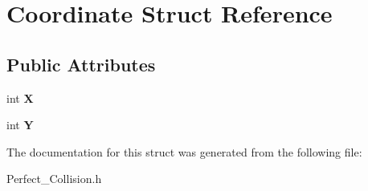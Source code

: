 \hypertarget{structCoordinate}{}\section{Coordinate Struct Reference}
\label{structCoordinate}
\subsection*{Public Attributes}
\begin{DoxyCompactItemize}
\item 
\mbox{\label{structCoordinate_aec4cc10f8f54cb0270096af93fd9e1d6}} 
int {\bfseries X}
\item 
\mbox{\label{structCoordinate_ae378244497aa6e51b1d74cdbfc452031}} 
int {\bfseries Y}
\end{DoxyCompactItemize}


The documentation for this struct was generated from the following file\+:\begin{DoxyCompactItemize}
\item 
Perfect\+\_\+\+Collision.\+h\end{DoxyCompactItemize}
